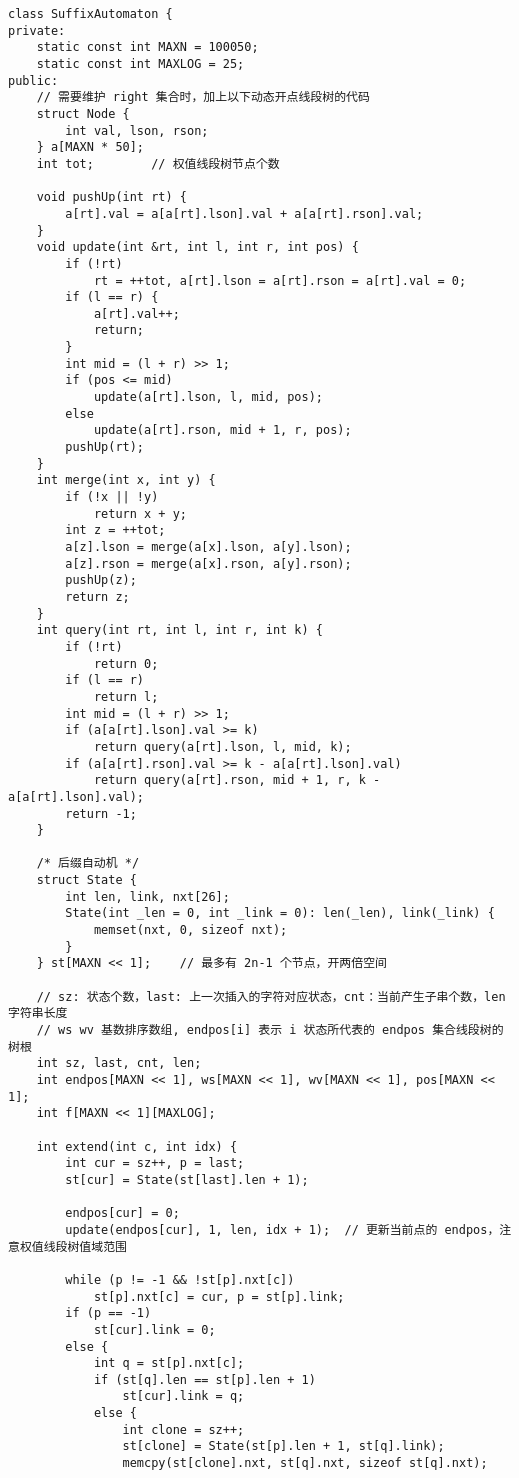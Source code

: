 \begin{verbatim}
class SuffixAutomaton {
private:
    static const int MAXN = 100050;
    static const int MAXLOG = 25;
public:
    // 需要维护 right 集合时，加上以下动态开点线段树的代码
    struct Node {
        int val, lson, rson;
    } a[MAXN * 50];
    int tot;        // 权值线段树节点个数

    void pushUp(int rt) {
        a[rt].val = a[a[rt].lson].val + a[a[rt].rson].val;
    }
    void update(int &rt, int l, int r, int pos) {
        if (!rt)
            rt = ++tot, a[rt].lson = a[rt].rson = a[rt].val = 0;
        if (l == r) {
            a[rt].val++;
            return;
        }
        int mid = (l + r) >> 1;
        if (pos <= mid)
            update(a[rt].lson, l, mid, pos);
        else
            update(a[rt].rson, mid + 1, r, pos);
        pushUp(rt);
    }
    int merge(int x, int y) {
        if (!x || !y)
            return x + y;
        int z = ++tot;
        a[z].lson = merge(a[x].lson, a[y].lson);
        a[z].rson = merge(a[x].rson, a[y].rson);
        pushUp(z);
        return z;
    }
    int query(int rt, int l, int r, int k) {
        if (!rt)
            return 0;
        if (l == r)
            return l;
        int mid = (l + r) >> 1;
        if (a[a[rt].lson].val >= k)
            return query(a[rt].lson, l, mid, k);
        if (a[a[rt].rson].val >= k - a[a[rt].lson].val)
            return query(a[rt].rson, mid + 1, r, k - a[a[rt].lson].val);
        return -1;
    }

    /* 后缀自动机 */
    struct State {
        int len, link, nxt[26];
        State(int _len = 0, int _link = 0): len(_len), link(_link) {
            memset(nxt, 0, sizeof nxt);
        }
    } st[MAXN << 1];    // 最多有 2n-1 个节点，开两倍空间

    // sz: 状态个数，last: 上一次插入的字符对应状态，cnt：当前产生子串个数，len 字符串长度
    // ws wv 基数排序数组, endpos[i] 表示 i 状态所代表的 endpos 集合线段树的树根
    int sz, last, cnt, len;
    int endpos[MAXN << 1], ws[MAXN << 1], wv[MAXN << 1], pos[MAXN << 1];
    int f[MAXN << 1][MAXLOG];
    
    int extend(int c, int idx) {
        int cur = sz++, p = last;
        st[cur] = State(st[last].len + 1);

        endpos[cur] = 0;
        update(endpos[cur], 1, len, idx + 1);  // 更新当前点的 endpos，注意权值线段树值域范围

        while (p != -1 && !st[p].nxt[c])
            st[p].nxt[c] = cur, p = st[p].link;
        if (p == -1)
            st[cur].link = 0;
        else {
            int q = st[p].nxt[c];
            if (st[q].len == st[p].len + 1)
                st[cur].link = q;
            else {
                int clone = sz++;
                st[clone] = State(st[p].len + 1, st[q].link);
                memcpy(st[clone].nxt, st[q].nxt, sizeof st[q].nxt);
                

\end{verbatim}
